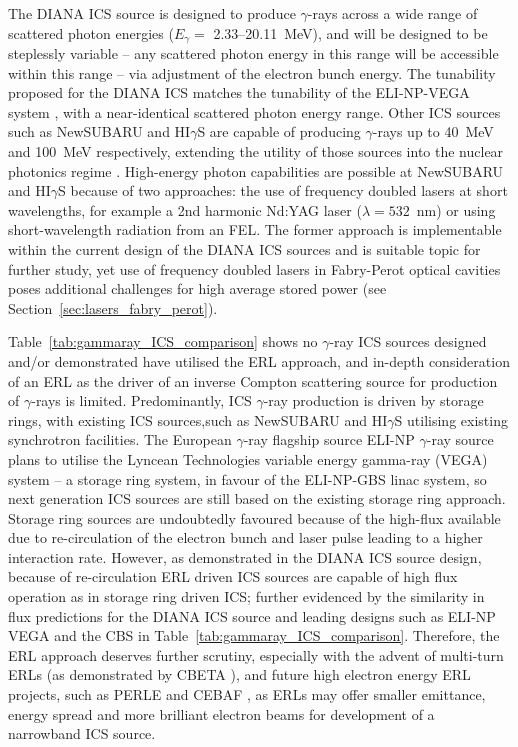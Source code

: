 \documentclass[../main.tex]{subfiles}
\begin{document}
The DIANA ICS source is designed to produce $\gamma$-rays across a wide range of scattered photon energies ($E_{\gamma}=$ 2.33--20.11~\si{\mega\electronvolt}), and will be designed to be steplessly variable -- any scattered photon energy in this range will be accessible within this range -- via adjustment of the electron bunch energy. The tunability proposed for the DIANA ICS matches the tunability of the ELI-NP-VEGA system \cite{tanaka2020current,elinp2019vega}, with a near-identical scattered photon energy range. Other ICS sources such as NewSUBARU and HI$\gamma$S are capable of producing $\gamma$-rays up to 40~\si{\mega\electronvolt} and 100~\si{\mega\electronvolt} respectively, extending the utility of those sources into the nuclear photonics regime \cite{budker2021expanding}. High-energy photon capabilities are possible at NewSUBARU and HI$\gamma$S because of two approaches: the use of frequency doubled lasers at short wavelengths, for example a 2nd harmonic Nd:YAG laser ($\lambda = 532$~\si{\nano\meter}) or using short-wavelength radiation from an FEL. The former approach is implementable within the current design of the DIANA ICS sources and is suitable topic for further study, yet use of frequency doubled lasers in Fabry-Perot optical cavities poses additional challenges for high average stored power (see Section~\ref{sec:lasers_fabry_perot}).

Table~\ref{tab:gammaray_ICS_comparison} shows no $\gamma$-ray ICS sources designed and/or demonstrated have utilised the ERL approach, and in-depth consideration of an ERL as the driver of an inverse Compton scattering source for production of $\gamma$-rays is limited. Predominantly, ICS $\gamma$-ray production is driven by storage rings, with existing ICS sources,such as NewSUBARU \cite{utsunomiya2015gamma} and HI$\gamma$S \cite{weller2009research} utilising existing synchrotron facilities. The European $\gamma$-ray flagship source ELI-NP $\gamma$-ray source plans to utilise the Lyncean Technologies variable energy gamma-ray (VEGA) system \cite{tanaka2020current,elinp2019vega} -- a storage ring system, in favour of the ELI-NP-GBS \cite{adriani2014technical} linac system, so next generation ICS sources are still based on the existing storage ring approach. Storage ring sources are undoubtedly favoured because of the high-flux available due to re-circulation of the electron bunch and laser pulse leading to a higher interaction rate. However, as demonstrated in the DIANA ICS source design, because of re-circulation ERL driven ICS sources are capable of high flux operation as in storage ring driven ICS; further evidenced by the similarity in flux predictions for the DIANA ICS source and leading designs such as ELI-NP VEGA and the CBS \cite{pan2019design} in Table~\ref{tab:gammaray_ICS_comparison}. Therefore, the ERL approach deserves further scrutiny, especially with the advent of multi-turn ERLs (as demonstrated by CBETA \cite{bartnik2020cbeta}), and future high electron energy ERL projects, such as PERLE \cite{angal2018perle} and CEBAF \cite{meot2016er}, as ERLs may offer smaller emittance, energy spread and more brilliant electron beams for development of a narrowband ICS source.
\end{document}
